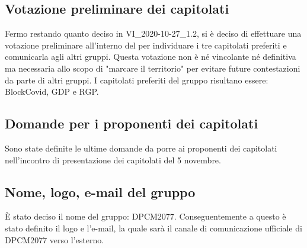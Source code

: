 \subsection*{Votazione preliminare dei capitolati}
Fermo restando quanto deciso in VI\_2020-10-27\_1.2, si è deciso di effettuare una votazione preliminare all'interno del  per individuare i tre capitolati preferiti e comunicarla agli altri gruppi. Questa votazione non è né vincolante né definitiva ma necessaria allo scopo di "marcare il territorio" per evitare future contestazioni da parte di altri gruppi. I capitolati preferiti del gruppo risultano essere: BlockCovid, GDP e RGP.
\subsection*{Domande per i proponenti dei capitolati}
Sono state definite le ultime domande da porre ai proponenti dei capitolati nell'incontro di presentazione dei capitolati del 5 novembre.
\subsection*{Nome, logo, e-mail del gruppo}
È stato deciso il nome del gruppo: DPCM2077. Conseguentemente a questo è stato definito il logo e l'e-mail, la quale sarà il canale di comunicazione ufficiale di DPCM2077 verso l'esterno.